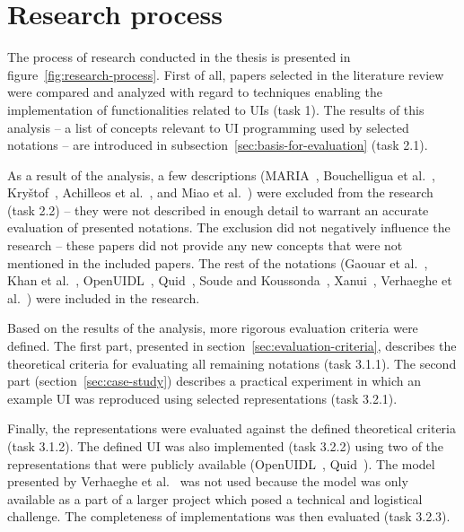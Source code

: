 \section{Research process}\label{sec:research-process}

The process of research conducted in the thesis is presented in figure~\ref{fig:research-process}.
First of all, papers selected in the literature review were compared and analyzed with regard to techniques enabling the implementation of functionalities related to UIs (task 1).
The results of this analysis -- a list of concepts relevant to UI programming used by selected notations -- are introduced in subsection~\ref{sec:basis-for-evaluation} (task 2.1).

As a result of the analysis, a few descriptions (MARIA~\cite{Paterno2009, MariaPDF}, Bouchelligua et al.~\cite{Bouchelligua2010}, Kryštof~\cite{kryvstof2010lpgm}, Achilleos et al.~\cite{Achilleos2011}, and Miao et al.~\cite{Miao2017}) were excluded from the research (task 2.2) -- they were not described in enough detail to warrant an accurate evaluation of presented notations.
The exclusion did not negatively influence the research -- these papers did not provide any new concepts that were not mentioned in the included papers.
The rest of the notations (Gaouar et al.~\cite{Gaouar2018}, Khan et al.~\cite{Khan2021}, OpenUIDL~\cite{Moldovan2020}, Quid~\cite{molina2018quid, Molina2019}, Soude and Koussonda~\cite{Soude2022}, Xanui~\cite{hermida2016xanui}, Verhaeghe et al.~\cite{Verhaeghe2021visual, Verhaeghe2021behavior}) were included in the research.

Based on the results of the analysis, more rigorous evaluation criteria were defined.
The first part, presented in section~\ref{sec:evaluation-criteria}, describes the theoretical criteria for evaluating all remaining notations (task 3.1.1).
The second part (section~\ref{sec:case-study}) describes a practical experiment in which an example UI was reproduced using selected representations (task 3.2.1).

Finally, the representations were evaluated against the defined theoretical criteria (task 3.1.2).
The defined UI was also implemented (task 3.2.2) using two of the representations that were publicly available (OpenUIDL~\cite{Moldovan2020}, Quid~\cite{molina2018quid, Molina2019}).
The model presented by Verhaeghe et al.~\cite{Verhaeghe2021visual, Verhaeghe2021behavior} was not used because the model was only available as a part of a larger project which posed a technical and logistical challenge.
The completeness of implementations was then evaluated (task 3.2.3).

